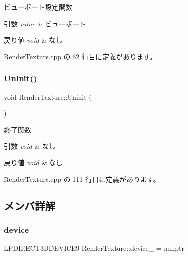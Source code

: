 ビューポート設定関数 


\begin{DoxyParams}{引数}
{\em value} & ビューポート \\
\hline
\end{DoxyParams}

\begin{DoxyRetVals}{戻り値}
{\em void} & なし \\
\hline
\end{DoxyRetVals}


 Render\+Texture.\+cpp の 62 行目に定義があります。

\mbox{\label{class_render_texture_a667858837eaff299a71c184ba4a7e358}} 
\subsubsection{\texorpdfstring{Uninit()}{Uninit()}}
{\footnotesize\ttfamily void Render\+Texture\+::\+Uninit (\begin{DoxyParamCaption}{ }\end{DoxyParamCaption})}



終了関数 


\begin{DoxyParams}{引数}
{\em void} & なし \\
\hline
\end{DoxyParams}

\begin{DoxyRetVals}{戻り値}
{\em void} & なし \\
\hline
\end{DoxyRetVals}


 Render\+Texture.\+cpp の 111 行目に定義があります。



\subsection{メンバ詳解}
\mbox{\label{class_render_texture_aed11b2bbf0972d9d20bbb59d1a28c2f2}} 
\subsubsection{\texorpdfstring{device\+\_\+}{device\_}}
{\footnotesize\ttfamily L\+P\+D\+I\+R\+E\+C\+T3\+D\+D\+E\+V\+I\+C\+E9 Render\+Texture\+::device\+\_\+ = nullptr\hspace{0.3cm}{\ttfamily [private]}}



